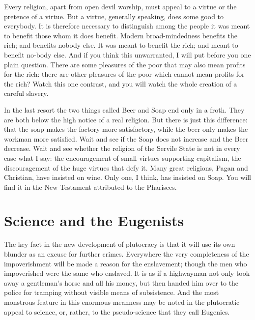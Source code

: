 \documentclass{book}
\begin{document}
Every religion, apart from open devil worship, must appeal to a virtue or the pretence of a virtue. But a virtue, generally speaking, does some good to everybody. It is therefore necessary to distinguish among the people it was meant to benefit those whom it does benefit. Modern broad-mindedness benefits the rich; and benefits nobody else. It was meant to benefit the rich; and meant to benefit no-body else. And if you think this unwarranted, I will put before you one plain question. There are some pleasures of the poor that may also mean profits for the rich: there are other pleasures of the poor which cannot mean profits for the rich? Watch this one contrast, and you will watch the whole creation of a careful slavery.

In the last resort the two things called Beer and Soap end only in a froth. They are both below the high notice of a real religion. But there is just this difference: that the soap makes the factory more satisfactory, while the beer only makes the workman more satisfied. Wait and see if the Soap does not increase and the Beer decrease. Wait and see whether the religion of the Servile State is not in every case what I say: the encouragement of small virtues supporting capitalism, the discouragement of the huge virtues that defy it. Many great religions, Pagan and Christian, have insisted on wine. Only one, I think, has insisted on Soap. You will find it in the New Testament attributed to the Pharisees.

\chapter{Science and the Eugenists}
\label{chapter-5}
The key fact in the new development of plutocracy is that it will use its own blunder as an excuse for further crimes. Everywhere the very completeness of the impoverishment will be made a reason for the enslavement; though the men who impoverished were the same who enslaved. It is as if a highwayman not only took away a gentleman’s horse and all his money, but then handed him over to the police for tramping without visible means of subsistence. And the most monstrous feature in this enormous meanness may be noted in the plutocratic appeal to science, or, rather, to the pseudo-science that they call Eugenics.
\end{document}
